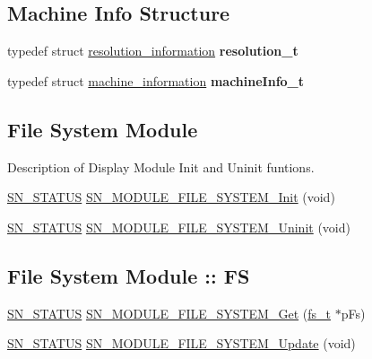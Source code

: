 \subsection*{Machine Info Structure}
\begin{DoxyCompactItemize}
\item 
\mbox{\label{group__MODULE__FILE__SYSTEM_ga14833fe076fd0d394b616735a2341198}} 
typedef struct \hyperlink{structresolution__information}{resolution\+\_\+information} {\bfseries resolution\+\_\+t}
\item 
\mbox{\label{group__MODULE__FILE__SYSTEM_ga1bae7007ff8bd7779a5b0a69c24013b9}} 
typedef struct \hyperlink{structmachine__information}{machine\+\_\+information} {\bfseries machine\+Info\+\_\+t}
\end{DoxyCompactItemize}
\subsection*{File System Module}
\label{_amgrpbae81c299b294162d53777337a624f9e}%
Description of Display Module Init and Uninit funtions. \begin{DoxyCompactItemize}
\item 
\hyperlink{group__SYSTEM__ERROR_ga4540713b9a7a18ce44d78c3a10f7442f}{S\+N\+\_\+\+S\+T\+A\+T\+US} \hyperlink{group__MODULE__FILE__SYSTEM_ga4b8101916d7de3e4d3004b79f4c8c2de}{S\+N\+\_\+\+M\+O\+D\+U\+L\+E\+\_\+\+F\+I\+L\+E\+\_\+\+S\+Y\+S\+T\+E\+M\+\_\+\+Init} (void)
\item 
\hyperlink{group__SYSTEM__ERROR_ga4540713b9a7a18ce44d78c3a10f7442f}{S\+N\+\_\+\+S\+T\+A\+T\+US} \hyperlink{group__MODULE__FILE__SYSTEM_ga39c0e153f169cc6bdb35bce4d2a9194b}{S\+N\+\_\+\+M\+O\+D\+U\+L\+E\+\_\+\+F\+I\+L\+E\+\_\+\+S\+Y\+S\+T\+E\+M\+\_\+\+Uninit} (void)
\end{DoxyCompactItemize}
\subsection*{File System Module \+:\+: FS}
\begin{DoxyCompactItemize}
\item 
\hyperlink{group__SYSTEM__ERROR_ga4540713b9a7a18ce44d78c3a10f7442f}{S\+N\+\_\+\+S\+T\+A\+T\+US} \hyperlink{group__MODULE__FILE__SYSTEM_gadfe4c4eeb9c662e30893824357bc46a5}{S\+N\+\_\+\+M\+O\+D\+U\+L\+E\+\_\+\+F\+I\+L\+E\+\_\+\+S\+Y\+S\+T\+E\+M\+\_\+\+Get} (\hyperlink{structfile__system}{fs\+\_\+t} $\ast$p\+Fs)
\item 
\hyperlink{group__SYSTEM__ERROR_ga4540713b9a7a18ce44d78c3a10f7442f}{S\+N\+\_\+\+S\+T\+A\+T\+US} \hyperlink{group__MODULE__FILE__SYSTEM_ga7df4490475224028341c54f5d5db5736}{S\+N\+\_\+\+M\+O\+D\+U\+L\+E\+\_\+\+F\+I\+L\+E\+\_\+\+S\+Y\+S\+T\+E\+M\+\_\+\+Update} (void)
\end{DoxyCompactItemize}
